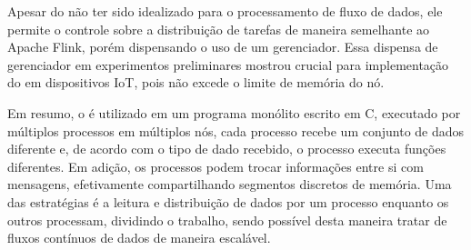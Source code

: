 Apesar do \mpi não ter sido idealizado para o processamento de fluxo de dados, ele
permite o controle sobre a distribuição de tarefas de maneira
semelhante ao Apache Flink, porém dispensando o uso de um
gerenciador. Essa dispensa de gerenciador em experimentos preliminares mostrou
crucial para implementação do \mfog em dispositivos IoT, pois não excede o limite de
memória do nó.

Em resumo, o \mpi é utilizado em um programa monólito escrito em C, executado
por múltiplos processos em múltiplos nós, cada processo recebe um conjunto de
dados diferente e, de acordo com o tipo de dado recebido, o processo executa
funções diferentes.
Em adição, os processos podem trocar informações entre si com mensagens,
efetivamente compartilhando segmentos discretos de memória.
Uma das estratégias é a leitura e distribuição de dados por um processo enquanto
os outros processam, dividindo o trabalho, sendo possível desta maneira tratar
de fluxos contínuos de dados de maneira escalável.

